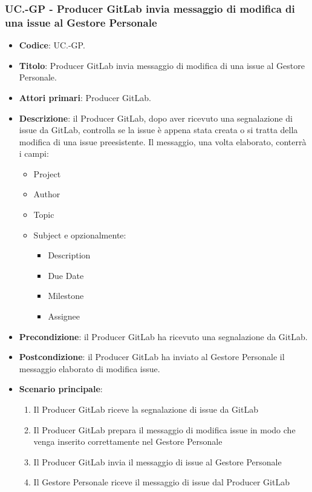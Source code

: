 	\subsubsection{UC\theuccount.\thesubuccount-GP - Producer GitLab invia messaggio di modifica di una issue al Gestore Personale}
		\begin{itemize}
			\item \textbf{Codice}: UC\theuccount.\thesubuccount-GP.
			\item \textbf{Titolo}: Producer GitLab invia messaggio di modifica di una issue al Gestore Personale.
			\item \textbf{Attori primari}: Producer GitLab.
			\item \textbf{Descrizione}: il Producer GitLab, dopo aver ricevuto una segnalazione di issue da GitLab, controlla se la issue è appena stata creata o si tratta della modifica di una issue preesistente. Il messaggio, una volta elaborato, conterrà i campi:
			\begin{itemize}
				\item Project
                \item Author
				\item Topic
				\item Subject e opzionalmente:
				\begin{itemize}
					\item Description
					\item Due Date
					\item Milestone
					\item Assignee
				\end{itemize}
			\end{itemize}
			\item \textbf{Precondizione}: il Producer GitLab ha ricevuto una segnalazione da GitLab.
			\item \textbf{Postcondizione}: il Producer GitLab ha inviato al Gestore Personale il messaggio
			elaborato di modifica issue.
			\item \textbf{Scenario principale}:
			\begin{enumerate}
				\item Il Producer GitLab riceve la segnalazione di issue da GitLab
				\item Il Producer GitLab prepara il messaggio di modifica issue in modo che venga inserito correttamente nel Gestore Personale
				\item Il Producer GitLab invia il messaggio di issue al Gestore Personale
                \item Il Gestore Personale riceve il messaggio di issue dal Producer GitLab
			\end{enumerate}
		\end{itemize}

